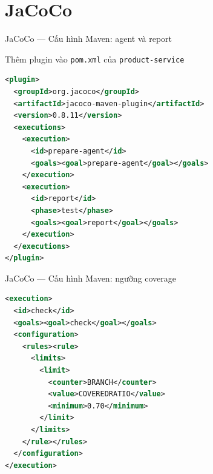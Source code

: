 \documentclass[aspectratio=169,12pt]{beamer}
\begin{document}
\section{JaCoCo}

\begin{frame}[fragile,shrink=12]{JaCoCo --- Cấu hình Maven: agent và report}
  \begin{block}{Thêm plugin vào \texttt{pom.xml} của \texttt{product-service}}
\begin{lstlisting}[language=xml]
<plugin>
  <groupId>org.jacoco</groupId>
  <artifactId>jacoco-maven-plugin</artifactId>
  <version>0.8.11</version>
  <executions>
    <execution>
      <id>prepare-agent</id>
      <goals><goal>prepare-agent</goal></goals>
    </execution>
    <execution>
      <id>report</id>
      <phase>test</phase>
      <goals><goal>report</goal></goals>
    </execution>
  </executions>
</plugin>
\end{lstlisting}
  \end{block}
\end{frame}

\begin{frame}[fragile,shrink=12]{JaCoCo --- Cấu hình Maven: ngưỡng coverage}
\begin{lstlisting}[language=xml]
<execution>
  <id>check</id>
  <goals><goal>check</goal></goals>
  <configuration>
    <rules><rule>
      <limits>
        <limit>
          <counter>BRANCH</counter>
          <value>COVEREDRATIO</value>
          <minimum>0.70</minimum>
        </limit>
      </limits>
    </rule></rules>
  </configuration>
</execution>
\end{lstlisting}
\end{frame}
\end{document}
